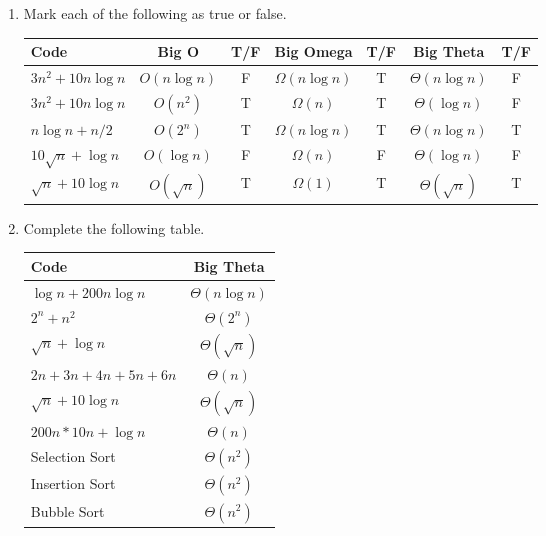 \documentclass[11pt]{article}
\begin{document}
    \begin{enumerate}
        \item Mark each of the following as true or false.
        \begin{center}
            \begin{tabular}{l | c | c | c | c | c | c}
                Code & Big O & T/F & Big Omega & T/F & Big Theta & T/F \\ \hline
                $3 n^2 + 10 n \log n$ & $O(n \log n)$ & F & $\Omega(n \log n)$ & T & $\Theta(n \log n)$ & F \\ \hline
                $3 n^2 + 10 n \log n$ & $O(n^2)$ & T & $\Omega(n)$ & T & $\Theta(\log n)$ & F \\ \hline
                $n \log n + n/2$ & $O(2^n)$ & T & $\Omega(n \log n)$ & T & $\Theta(n \log n)$ & T \\ \hline
                $10 \sqrt{n} + \log n$ & $O(\log n)$ & F & $\Omega(n)$ & F & $\Theta(\log n)$ & F \\ \hline
                $\sqrt{n} + 10 \log n$ & $O(\sqrt n)$ & T & $\Omega(1)$ & T & $\Theta(\sqrt n)$ & T \\ \hline
            \end{tabular}
        \end{center}
        \item Complete the following table.
        \begin{center}
            \begin{tabular}{l | c }
                Code & Big Theta \\ \hline
                $\log n + 200 n \log n$ & $\Theta(n \log n)$ \\ \hline
                $2^n + n^2$ & $\Theta(2^n)$ \\ \hline
                $\sqrt n + \log n$ & $\Theta(\sqrt n)$ \\ \hline
                $2n + 3n + 4n + 5n + 6n$ & $\Theta(n)$ \\ \hline
                $\sqrt{n} + 10 \log n$ & $\Theta(\sqrt n)$ \\ \hline
                $200 n * 10 n + \log n$ & $\Theta(n)$ \\ \hline
                Selection Sort & $\Theta(n^2)$ \\ \hline
                Insertion Sort & $\Theta(n^2)$ \\ \hline
                Bubble Sort & $\Theta(n^2)$ \\ \hline
            \end{tabular}
        \end{center}
        

\end{enumerate}
\end{document}
